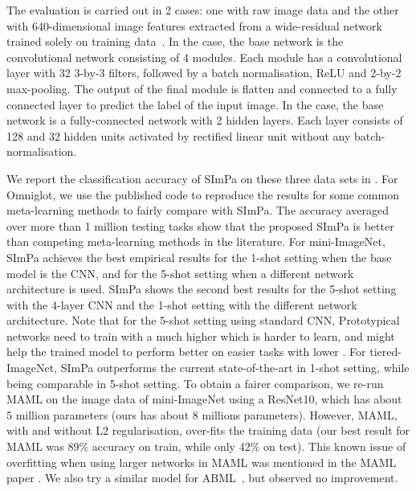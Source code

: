         The evaluation is carried out in 2 cases: one with raw image data and the other with 640-dimensional image features extracted from a wide-residual network trained solely on training data~\citep{rusu2019meta}. In the  case, the base network is the  convolutional network consisting of 4 modules. Each module has a convolutional layer with 32 3-by-3 filters, followed by a batch normalisation, ReLU and 2-by-2 max-pooling. The output of the final module is flatten and connected to a fully connected layer to predict the label of the input image. 
In the  case, the base network is a fully-connected network with 2 hidden layers. Each layer consists of 128 and 32 hidden units activated by rectified linear unit without any batch-normalisation.

        We report the classification accuracy of SImPa on these three data sets in \tableautorefname{~\ref{tab:classification_accuracies}}. For Omniglot, we use the published code to reproduce the results for some common meta-learning methods to fairly compare with SImPa. The accuracy averaged over more than 1 million testing tasks show that the proposed SImPa is better than competing meta-learning methods in the literature.
        For mini-ImageNet, SImPa achieves the best empirical results for the 1-shot setting when the base model is the  CNN, and for the 5-shot setting when a different network architecture is used. SImPa shows the second best results for the 5-shot setting with the 4-layer CNN and the 1-shot setting with the different network architecture. Note that for the 5-shot setting using standard CNN, Prototypical networks need to train with a much higher  which is harder to learn, and might help the trained model to perform better on easier tasks with lower . 
For tiered-ImageNet, SImPa outperforms the current state-of-the-art in 1-shot setting, while being comparable in 5-shot setting. To obtain a fairer comparison, we re-run MAML on the image data of mini-ImageNet using a ResNet10, which has about 5 million parameters (ours has about 8 millions parameters). However, MAML, with and without L2 regularisation, over-fits the training data (our best result for MAML was 89\% accuracy on train, while only 42\% on test). This known issue of overfitting when using larger networks in MAML was mentioned in the MAML paper \cite[Section 5.2]{finn2017model}. We also try a similar model for ABML~\cite{ravi2018amortized}, but observed no improvement.
        
